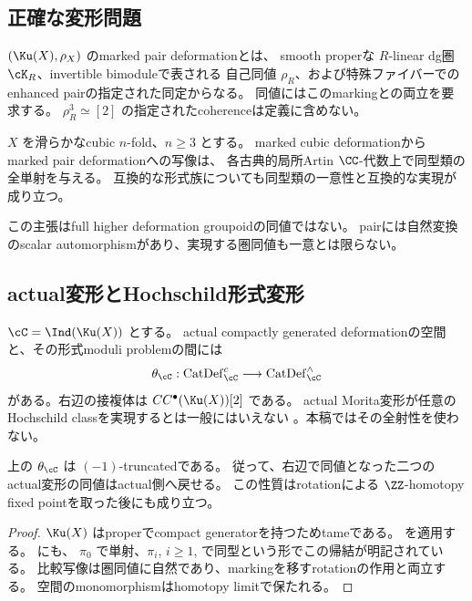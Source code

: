 \subsection{正確な変形問題}

\begin{definition}
 \((\Ku(X),\rho_X)\) のmarked pair deformationとは、
 smooth properな \(R\)-linear dg圏 \(\cK_R\)、invertible bimoduleで表される
 自己同値 \(\rho_R\)、および特殊ファイバーでのenhanced pairの指定された同定からなる。
 同値にはこのmarkingとの両立を要求する。
 \(\rho_R^3\simeq[2]\) の指定されたcoherenceは定義に含めない。
\end{definition}

\begin{theorem}[pairの形式的復元]\label{thm:pair}
 \(X\) を滑らかなcubic \(n\)-fold、\(n\ge3\) とする。
 marked cubic deformationからmarked pair deformationへの写像は、
 各古典的局所Artin \(\CC\)-代数上で同型類の全単射を与える。
 互換的な形式族についても同型類の一意性と互換的な実現が成り立つ。
\end{theorem}

この主張はfull higher deformation groupoidの同値ではない。
pairには自然変換のscalar automorphismがあり、実現する圏同値も一意とは限らない。

\subsection{actual変形とHochschild形式変形}

\(\cC=\Ind(\Ku(X))\) とする。
actual compactly generated deformationの空間と、その形式moduli problemの間には
\[
 \theta_{\cC}:\operatorname{CatDef}_{\cC}^{c}
 \longrightarrow\operatorname{CatDef}_{\cC}^{\wedge}
\]
がある。右辺の接複体は \(CC^\bullet(\Ku(X))[2]\) である。
actual Morita変形が任意のHochschild classを実現するとは一般にはいえない
\cite{KL}。本稿ではその全射性を使わない。

\begin{lemma}\label{lem:theta}
 上の \(\theta_{\cC}\) は \((-1)\)-truncatedである。
 従って、右辺で同値となった二つのactual変形の同値はactual側へ戻せる。
 この性質はrotationによる \(\ZZ\)-homotopy fixed pointを取った後にも成り立つ。
\end{lemma}
\begin{proof}
 \(\Ku(X)\) はproperでcompact generatorを持つためtameである。
 \cite[Proposition 5.3.21, Theorem 5.1.9]{Lurie} を適用する。
 \cite[Definition 3.3, Section 3.3]{BKP} にも、
 \(\pi_0\) で単射、\(\pi_i\), \(i\ge1\), で同型という形でこの帰結が明記されている。
 比較写像は圏同値に自然であり、markingを移すrotationの作用と両立する。
 空間のmonomorphismはhomotopy limitで保たれる。
\end{proof}

